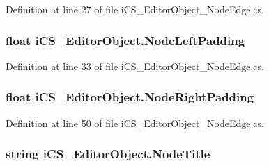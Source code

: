 Definition at line 27 of file i\+C\+S\+\_\+\+Editor\+Object\+\_\+\+Node\+Edge.\+cs.

\hypertarget{classi_c_s___editor_object_a2cedb0458c735ebbdb00dfc4657032d6}{
\subsubsection[{Node\+Left\+Padding}]{\setlength{\rightskip}{0pt plus 5cm}float i\+C\+S\+\_\+\+Editor\+Object.\+Node\+Left\+Padding\hspace{0.3cm}{\ttfamily [get]}}}\label{classi_c_s___editor_object_a2cedb0458c735ebbdb00dfc4657032d6}


Definition at line 33 of file i\+C\+S\+\_\+\+Editor\+Object\+\_\+\+Node\+Edge.\+cs.

\hypertarget{classi_c_s___editor_object_aa13b13743ff0ece2de3e470c9e0b95ee}{
\subsubsection[{Node\+Right\+Padding}]{\setlength{\rightskip}{0pt plus 5cm}float i\+C\+S\+\_\+\+Editor\+Object.\+Node\+Right\+Padding\hspace{0.3cm}{\ttfamily [get]}}}\label{classi_c_s___editor_object_aa13b13743ff0ece2de3e470c9e0b95ee}


Definition at line 50 of file i\+C\+S\+\_\+\+Editor\+Object\+\_\+\+Node\+Edge.\+cs.

\hypertarget{classi_c_s___editor_object_aa6b4846da58ca2c918314bfcf4d1effd}{
\subsubsection[{Node\+Title}]{\setlength{\rightskip}{0pt plus 5cm}string i\+C\+S\+\_\+\+Editor\+Object.\+Node\+Title\hspace{0.3cm}{\ttfamily [get]}}}\label{classi_c_s___editor_object_aa6b4846da58ca2c918314bfcf4d1effd}


